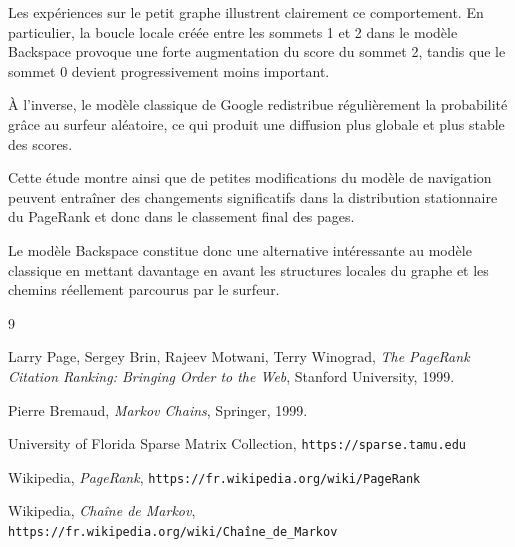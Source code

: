 \documentclass[a4paper,11pt]{article}
\begin{document}
Les expériences sur le petit graphe illustrent clairement ce comportement. En particulier, la boucle locale créée entre les sommets 1 et 2 dans le modèle Backspace provoque une forte augmentation du score du sommet 2, tandis que le sommet 0 devient progressivement moins important.

À l’inverse, le modèle classique de Google redistribue régulièrement la probabilité grâce au surfeur aléatoire, ce qui produit une diffusion plus globale et plus stable des scores.

Cette étude montre ainsi que de petites modifications du modèle de navigation peuvent entraîner des changements significatifs dans la distribution stationnaire du PageRank et donc dans le classement final des pages.

Le modèle Backspace constitue donc une alternative intéressante au modèle classique en mettant davantage en avant les structures locales du graphe et les chemins réellement parcourus par le surfeur.

\begin{thebibliography}{9}

Larry Page, Sergey Brin, Rajeev Motwani, Terry Winograd,
\textit{The PageRank Citation Ranking: Bringing Order to the Web},
Stanford University, 1999.

Pierre Bremaud,
\textit{Markov Chains},
Springer, 1999.

University of Florida Sparse Matrix Collection,
\texttt{https://sparse.tamu.edu}

Wikipedia,
\textit{PageRank},
\texttt{https://fr.wikipedia.org/wiki/PageRank}

Wikipedia,
\textit{Chaîne de Markov},
\texttt{https://fr.wikipedia.org/wiki/Chaîne_de_Markov}

\end{thebibliography}
\end{document}
